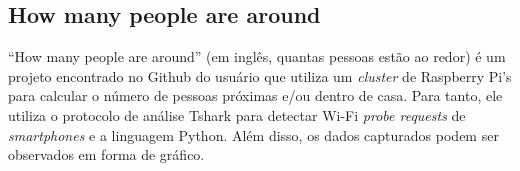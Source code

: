 \subsection{How many people are around}
``How many people are around'' (em inglês, quantas pessoas estão ao redor) é um projeto encontrado no Github do usuário  que utiliza um \emph{cluster} de Raspberry Pi's para calcular o número de pessoas próximas e/ou dentro de casa. Para tanto, ele utiliza o protocolo de análise Tshark para detectar Wi-Fi \emph{probe requests} de \emph{smartphones} e a linguagem Python. Além disso, os dados capturados podem ser observados em forma de gráfico.
